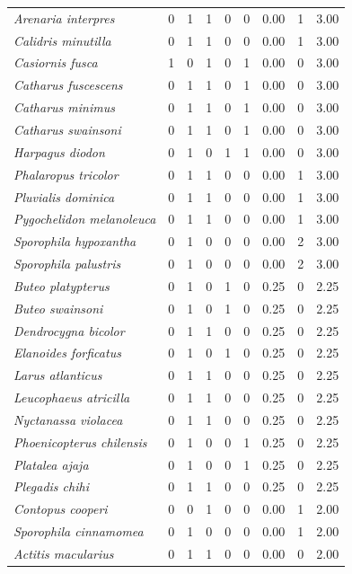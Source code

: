 \documentclass[
  oneside]{scrbook}
\begin{document}
\begin{longtable}{>{}lrrrrrrrr}
\em{Arenaria interpres} & 0 & 1 & 1 & 0 & 0 & 0.00 & 1 & 3.00\\
\em{Calidris minutilla} & 0 & 1 & 1 & 0 & 0 & 0.00 & 1 & 3.00\\
\em{Casiornis fusca} & 1 & 0 & 1 & 0 & 1 & 0.00 & 0 & 3.00\\
\em{Catharus fuscescens} & 0 & 1 & 1 & 0 & 1 & 0.00 & 0 & 3.00\\
\addlinespace
\em{Catharus minimus} & 0 & 1 & 1 & 0 & 1 & 0.00 & 0 & 3.00\\
\em{Catharus swainsoni} & 0 & 1 & 1 & 0 & 1 & 0.00 & 0 & 3.00\\
\em{Harpagus diodon} & 0 & 1 & 0 & 1 & 1 & 0.00 & 0 & 3.00\\
\em{Phalaropus tricolor} & 0 & 1 & 1 & 0 & 0 & 0.00 & 1 & 3.00\\
\em{Pluvialis dominica} & 0 & 1 & 1 & 0 & 0 & 0.00 & 1 & 3.00\\
\addlinespace
\em{Pygochelidon melanoleuca} & 0 & 1 & 1 & 0 & 0 & 0.00 & 1 & 3.00\\
\em{Sporophila hypoxantha} & 0 & 1 & 0 & 0 & 0 & 0.00 & 2 & 3.00\\
\em{Sporophila palustris} & 0 & 1 & 0 & 0 & 0 & 0.00 & 2 & 3.00\\
\em{Buteo platypterus} & 0 & 1 & 0 & 1 & 0 & 0.25 & 0 & 2.25\\
\em{Buteo swainsoni} & 0 & 1 & 0 & 1 & 0 & 0.25 & 0 & 2.25\\
\addlinespace
\em{Dendrocygna bicolor} & 0 & 1 & 1 & 0 & 0 & 0.25 & 0 & 2.25\\
\em{Elanoides forficatus} & 0 & 1 & 0 & 1 & 0 & 0.25 & 0 & 2.25\\
\em{Larus atlanticus} & 0 & 1 & 1 & 0 & 0 & 0.25 & 0 & 2.25\\
\em{Leucophaeus atricilla} & 0 & 1 & 1 & 0 & 0 & 0.25 & 0 & 2.25\\
\em{Nyctanassa violacea} & 0 & 1 & 1 & 0 & 0 & 0.25 & 0 & 2.25\\
\addlinespace
\em{Phoenicopterus chilensis} & 0 & 1 & 0 & 0 & 1 & 0.25 & 0 & 2.25\\
\em{Platalea ajaja} & 0 & 1 & 0 & 0 & 1 & 0.25 & 0 & 2.25\\
\em{Plegadis chihi} & 0 & 1 & 1 & 0 & 0 & 0.25 & 0 & 2.25\\
\em{Contopus cooperi} & 0 & 0 & 1 & 0 & 0 & 0.00 & 1 & 2.00\\
\em{Sporophila cinnamomea} & 0 & 1 & 0 & 0 & 0 & 0.00 & 1 & 2.00\\
\addlinespace
\em{Actitis macularius} & 0 & 1 & 1 & 0 & 0 & 0.00 & 0 & 2.00\\

\end{longtable}
\end{document}
